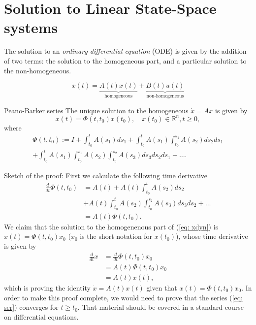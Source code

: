 \section{Solution to Linear State-Space systems}
The solution to an \emph{ordinary differential equation} (ODE) is given by the addition of two terms: the solution to the homogeneous part, and a particular solution to the non-homogeneous.

\begin{equation}
	\dot x(t) = \underbrace{A(t)x(t)}_{\text{homogeneous}} + \underbrace{B(t)u(t)}_{\text{non-homogeneous}}
	\label{eq: xdyn}
\end{equation}

\begin{theorem}{Peano-Barker series}
The unique solution to the homogeneous $\dot x = Ax$ is given by
	\begin{equation}
		x(t) = \Phi(t,t_0)x(t_0), \quad x(t_0)\in\mathbb{R}^n, t\geq 0,
	\end{equation}
where
	\begin{align}
		\Phi(t,t_0) := I + \int_{t_0}^t A(s_1)ds_1 + \int_{t_0}^t A(s_1) \int_{t_0}^{s_1} A(s_2)ds_2ds_1 \nonumber \\ + \int_{t_0}^t A(s_1) \int_{t_0}^{s_1} A(s_2)\int_{t_0}^{s_2} A(s_3) ds_3ds_2ds_1 + \dots . \label{eq: ser}
	\end{align}
\end{theorem}
Sketch of the proof:
First we calculate the following time derivative
	\begin{align}
		\frac{d}{dt}\Phi(t,t_0) &= A(t) + A(t)\int_{t_0}^{t}A(s_2)ds_2 \nonumber \\ &+ A(t)\int_{t_0}^t A(s_2) \int_{t_0}^{s_2} A(s_3)ds_3ds_2 + \dots \nonumber \\
		&= A(t) \Phi(t,t_0).
	\end{align}
We claim that the solution to the homogenenous part of (\ref{eq: xdyn}) is $x(t) = \Phi(t,t_0)x_0$ ($x_0$ is the short notation for $x(t_0)$), whose time derivative is given by
\begin{align}
	\frac{d}{dt} x &= \frac{d}{dt}\Phi(t,t_0)x_0 \nonumber \\
	&= A(t) \Phi(t,t_0) x_0 \nonumber \\
	&= A(t)x(t),
\end{align}
which is proving the identity $\dot x = A(t)x(t)$ given that $x(t) = \Phi(t,t_0)x_0$. In order to make this proof complete, we would need to prove that the series (\ref{eq: ser}) converges for $t\geq t_0$. That material should be covered in a standard course on differential equations.

